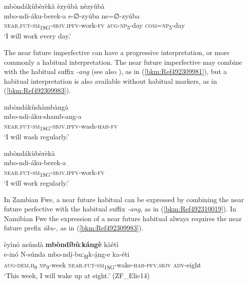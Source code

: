 \ea
\label{bkm:Ref98852252}
mbòndákùbèrèkà èzyúbà nèzyûbà\\
\gll mbo-ndi-áku-berek-a      e-∅-zyúba  ne=∅-zyúba\\
\textsc{near}.\textsc{fut}-\textsc{sm}\textsubscript{1SG}-\textsc{sbjv}.\textsc{ipfv}-work-\textsc{fv}  \textsc{aug}-\textsc{np}\textsubscript{5}-day  \textsc{com}=\textsc{np}\textsubscript{5}-day\\
\glt ‘I will work every day.’
\z

The near future imperfective can have a progressive interpretation, or more commonly a habitual interpretation. The near future imperfective may combine with the habitual suffix \textit{-ang} (see also ), as in (\ref{bkm:Ref492309981}), but a habitual interpretation is also available without habitual markers, as in (\ref{bkm:Ref492309983}).

\ea
\label{bkm:Ref492309981}
mbòndákùshàmbàngà\\
\gll mbo-ndi-áku-shamb-ang-a\\
\textsc{near}.\textsc{fut}-\textsc{sm}\textsubscript{1SG}-\textsc{sbjv}.\textsc{ipfv}-wash-\textsc{hab}-\textsc{fv}\\
\glt ‘I will wash regularly.’
\z

\ea
\label{bkm:Ref492309983}
\glll mbòndákùbèrèkà\\
mbo-ndi-áku-berek-a\\
\textsc{near}.\textsc{fut}-\textsc{sm}\textsubscript{1SG}-\textsc{sbjv}.\textsc{ipfv}-work-\textsc{fv}\\
\glt ‘I will work regularly.’
\z

In Zambian Fwe, a near future habitual can be expressed by combining the near future perfective with the habitual suffix \textit{-ang}, as in (\ref{bkm:Ref492310019}). In Namibian Fwe the expression of a near future habitual always requires the near future prefix \textit{áku-}, as in (\ref{bkm:Ref492309983}).

\ea
\label{bkm:Ref492310019}
èyìnó nsûndà \textbf{mbòndíbùːkángè} kàêtì\\
\gll e-inó    N-súnda  mbo-ndí̲-buː\textsubscript{H}k-á̲ng-e      ka-éti\\
\textsc{aug}-\textsc{dem}.\textsc{ii}\textsubscript{9}  \textsc{np}\textsubscript{9}-week  \textsc{near}.\textsc{fut}-\textsc{sm}\textsubscript{1SG}-wake-\textsc{hab}-\textsc{pfv}.\textsc{sbjv}  \textsc{adv}-eight\\
\glt ‘This week, I will wake up at eight.’ (ZF\_Elic14)
\z


